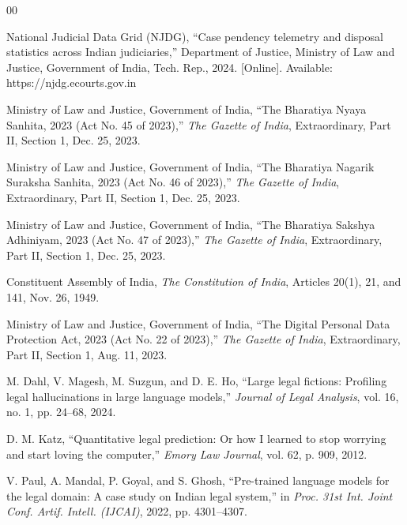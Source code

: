 \documentclass[conference]{IEEEtran}
\begin{document}
\begin{thebibliography}{00}

National Judicial Data Grid (NJDG), ``Case pendency telemetry and disposal statistics across Indian judiciaries,'' Department of Justice, Ministry of Law and Justice, Government of India, Tech. Rep., 2024. [Online]. Available: https://njdg.ecourts.gov.in

Ministry of Law and Justice, Government of India, ``The Bharatiya Nyaya Sanhita, 2023 (Act No. 45 of 2023),'' \textit{The Gazette of India}, Extraordinary, Part II, Section 1, Dec. 25, 2023.

Ministry of Law and Justice, Government of India, ``The Bharatiya Nagarik Suraksha Sanhita, 2023 (Act No. 46 of 2023),'' \textit{The Gazette of India}, Extraordinary, Part II, Section 1, Dec. 25, 2023.

Ministry of Law and Justice, Government of India, ``The Bharatiya Sakshya Adhiniyam, 2023 (Act No. 47 of 2023),'' \textit{The Gazette of India}, Extraordinary, Part II, Section 1, Dec. 25, 2023.

Constituent Assembly of India, \textit{The Constitution of India}, Articles 20(1), 21, and 141, Nov. 26, 1949.

Ministry of Law and Justice, Government of India, ``The Digital Personal Data Protection Act, 2023 (Act No. 22 of 2023),'' \textit{The Gazette of India}, Extraordinary, Part II, Section 1, Aug. 11, 2023.

M. Dahl, V. Magesh, M. Suzgun, and D. E. Ho, ``Large legal fictions: Profiling legal hallucinations in large language models,'' \textit{Journal of Legal Analysis}, vol. 16, no. 1, pp. 24--68, 2024.

D. M. Katz, ``Quantitative legal prediction: Or how I learned to stop worrying and start loving the computer,'' \textit{Emory Law Journal}, vol. 62, p. 909, 2012.

V. Paul, A. Mandal, P. Goyal, and S. Ghosh, ``Pre-trained language models for the legal domain: A case study on Indian legal system,'' in \textit{Proc. 31st Int. Joint Conf. Artif. Intell. (IJCAI)}, 2022, pp. 4301--4307.


\end{thebibliography}
\end{document}
